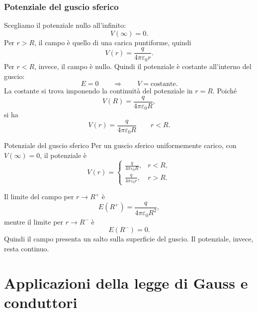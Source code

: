 \documentclass[a4paper]{article}
\begin{document}
\section{Potenziale del guscio sferico}

Scegliamo il potenziale nullo all'infinito:
\[
    V(\infty)=0.
\]
Per \(r>R\), il campo è quello di una carica puntiforme, quindi
\[
    V(r)=\frac{q}{4\pi\varepsilon_0r}.
\]
Per \(r<R\), invece, il campo è nullo. Quindi il potenziale è costante all'interno del guscio:
\[
    E=0\qquad\Longrightarrow\qquad V=\text{costante}.
\]
La costante si trova imponendo la continuità del potenziale in \(r=R\). Poiché
\[
    V(R)=\frac{q}{4\pi\varepsilon_0R},
\]
si ha
\[
    V(r)=\frac{q}{4\pi\varepsilon_0R}
    \qquad r<R.
\]

\begin{snippettheorem}{Potenziale del guscio sferico}
    Per un guscio sferico uniformemente carico, con \(V(\infty)=0\), il potenziale è
    \[
        V(r)=
        \begin{cases}
            \displaystyle \frac{q}{4\pi\varepsilon_0R}, & r<R,\\[6pt]
            \displaystyle \frac{q}{4\pi\varepsilon_0r}, & r>R.
        \end{cases}
    \]
\end{snippettheorem}

\begin{center}
\end{center}

Il limite del campo per \(r\to R^+\) è
\[
    E(R^+)=\frac{q}{4\pi\varepsilon_0R^2},
\]
mentre il limite per \(r\to R^-\) è
\[
    E(R^-)=0.
\]
Quindi il campo presenta un salto sulla superficie del guscio. Il potenziale, invece, resta continuo.

\pagebreak
\part{Applicazioni della legge di Gauss e conduttori}
\end{document}
